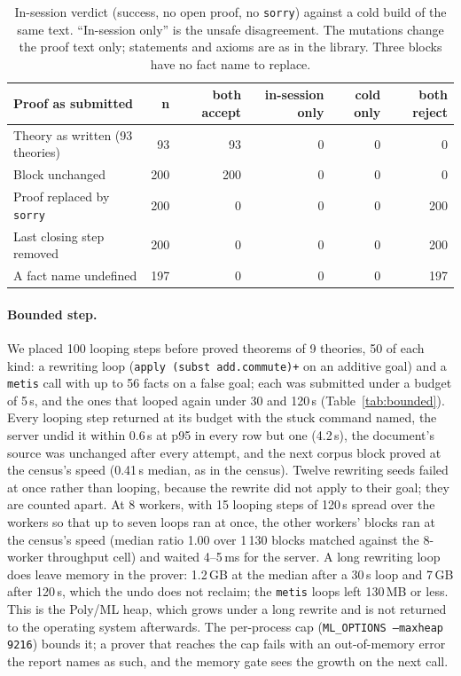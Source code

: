 \documentclass[11pt]{article}
\newcommand{\code}[1]{\colorbox{gray!12}{\texttt{\vphantom{Ag}#1}}}
\begin{document}
\begin{table}[!htb]
\centering\small
\begin{tabular}{@{}l r rrrr@{}}
\toprule
Proof as submitted & n & both accept & in-session only & cold only & both reject \\
\midrule
Theory as written (93 theories) & 93 & 93 & 0 & 0 & 0 \\
Block unchanged & 200 & 200 & 0 & 0 & 0 \\
Proof replaced by \code{sorry} & 200 & 0 & 0 & 0 & 200 \\
Last closing step removed & 200 & 0 & 0 & 0 & 200 \\
A fact name undefined & 197 & 0 & 0 & 0 & 197 \\
\bottomrule
\end{tabular}
\caption{In-session verdict (success, no open proof, no \code{sorry})
  against a cold build of the same text. ``In-session only'' is the unsafe
  disagreement. The mutations change the proof text only; statements and
  axioms are as in the library. Three blocks have no fact name to
  replace.}
\label{tab:agreement}
\end{table}

\paragraph{Bounded step.} We placed 100 looping steps before proved
theorems of 9 theories, 50 of each kind: a rewriting loop
(\code{apply (subst add.commute)+} on an additive goal) and a
\code{metis} call with up to 56 facts on a false goal; each was submitted
under a budget of 5\,s, and the ones that looped again under 30 and
120\,s (Table~\ref{tab:bounded}). Every looping step returned at its
budget with the stuck command named, the server undid it within 0.6\,s at
p95 in every row but one (4.2\,s), the document's source was unchanged
after every attempt, and the next corpus block proved at the census's
speed (0.41\,s median, as in the census). Twelve rewriting seeds failed at
once rather than looping, because the rewrite did not apply to their goal;
they are counted apart. At 8 workers, with 15 looping steps of 120\,s
spread over the workers so that up to seven loops ran at once, the other
workers' blocks ran at the census's speed (median ratio 1.00 over 1\,130
blocks matched against the 8-worker throughput cell) and waited 4--5\,ms
for the server. A long rewriting loop does leave memory in the prover:
1.2\,GB at the median after a 30\,s loop and 7\,GB after 120\,s, which the
undo does not reclaim; the \code{metis} loops left 130\,MB or less. This
is the Poly/ML heap, which grows under a long rewrite and is not returned
to the operating system afterwards. The per-process cap
(\code{ML\_OPTIONS --maxheap 9216}) bounds it; a prover that reaches the
cap fails with an out-of-memory error the report names as such, and the
memory gate sees the growth on the next call.
\end{document}
